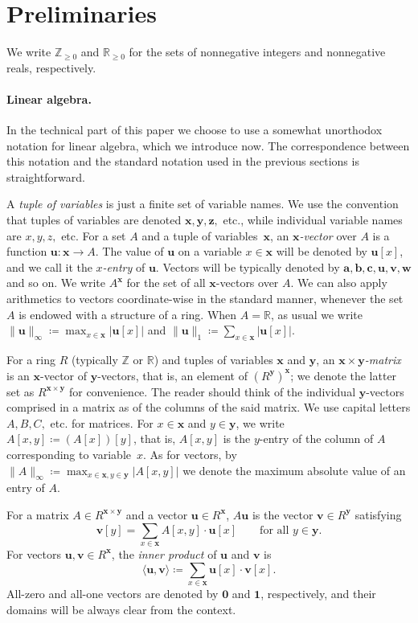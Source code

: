 \documentclass{theoretics}
\renewcommand{\geq}{\geqslant}
\newcommand{\Z}{\mathbb{Z}}
\newcommand{\Zn}{\Z_{\geq 0}}
\newcommand{\R}{\mathbb{R}}
\newcommand{\myRn}{\R_{\geq 0}} %
\newcommand{\tup}[1]{{\mathbf{#1}}}
\newcommand{\xx}{\tup x}
\newcommand{\ww}{\tup w}
\newcommand{\yy}{\tup y}
\newcommand{\zz}{\tup z}
\newcommand{\av}{\tup a}
\newcommand{\bb}{\tup b}
\newcommand{\cc}{\tup c}
\newcommand{\uu}{\tup u}
\newcommand{\myvv}{\tup v} %
\newcommand{\matrices}[3]{#1^{#2\times #3}}
\newcommand{\zero}{\tup 0}
\newcommand{\sca}[2]{\langle #1,#2\rangle}
\begin{document}
\section{Preliminaries}

We write $\Zn$ and $\myRn$ for the sets of nonnegative integers and nonnegative reals, respectively.

\paragraph*{Linear algebra.} In the technical part of this paper we choose to use a somewhat unorthodox notation for linear algebra, which we introduce now. The correspondence between this notation and the standard notation used in the previous sections is straightforward.

A {\em{tuple of variables}} is just a finite set of variable names. We use the convention that tuples of variables are denoted $\xx,\yy,\zz,$ etc., while individual variable names are $x,y,z,$ etc. For a set $A$ and a tuple of variables~$\xx$, an {\em{$\xx$-vector}} over $A$ is a function $\uu\colon \xx\to A$.
The value of $\uu$ on a variable $x\in \xx$ will be denoted by $\uu[x]$, and we call it the {\em{$x$-entry}} of $\uu$.
Vectors will be typically denoted by $\av,\bb,\cc,\uu,\myvv,\ww$ and so on. We write $A^{\xx}$ for the set of all $\xx$-vectors over $A$.
We can also apply arithmetics to vectors coordinate-wise in the standard manner, whenever the set $A$ is endowed with a structure of a ring. When $A=\R$, as usual we write
$\|\uu\|_\infty\coloneqq \max_{x\in \xx} |\uu[x]|$ and $\|\uu\|_1\coloneqq \sum_{x\in \xx} |\uu[x]|$.

For a ring $R$ (typically $\Z$ or $\R$) and tuples of variables $\tup x$ and $\tup y$, an {\em{$\tup x\times \tup y$-matrix}} is an $\tup x$-vector of $\tup y$-vectors, that is, an element of $(R^{\tup y})^{\tup x}$; we denote the latter set as $\matrices{R}{\xx}{\yy}$ for convenience.
The reader should think of the individual $\yy$-vectors comprised in a matrix as of the columns of the said matrix. We use capital letters $A,B,C,$ etc. for matrices. For $x\in \xx$ and $y\in \yy$, we write $A[x,y]\coloneqq (A[x])[y]$, that is, $A[x,y]$ is the $y$-entry of the column of $A$ corresponding to variable~$x$. As for vectors, by $\|A\|_{\infty}\coloneqq \max_{x\in \xx,y\in \yy} |A[x,y]|$ we denote the maximum absolute value of an entry of $A$.

For a matrix $A\in \matrices{R}{\xx}{\yy}$ and a vector $\uu\in R^{\xx}$, $A\uu$ is the vector $\myvv\in R^{\yy}$ satisfying
$$\myvv[y]=\sum_{x\in \xx} A[x,y]\cdot \uu[x]\qquad\textrm{for all }y\in \yy.$$
For vectors $\uu,\myvv\in R^{\xx}$, the {\em{inner product}} of $\uu$ and $\myvv$ is
$$\sca{\uu}{\myvv}\coloneqq \sum_{x\in \xx} \uu[x]\cdot \myvv[x].$$
All-zero and all-one vectors are denoted by $\zero$ and $\tup 1$, respectively, and their domains will be always clear from the context.
\end{document}
